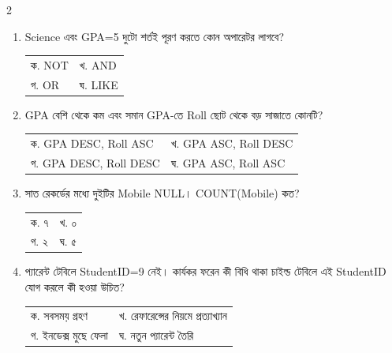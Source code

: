 \begin{multicols}{2}
\begin{enumerate}[resume]
\item \begin{minipage}[t]{\linewidth}
Science এবং GPA=5 দুটো শর্তই পূরণ করতে কোন অপারেটর লাগবে?
\par
\begin{tabularx}{\linewidth}{@{}X X@{}}
ক. NOT & খ. AND \\
গ. OR & ঘ. LIKE \\
\end{tabularx}
\end{minipage}
\vspace{1pt}

\item \begin{minipage}[t]{\linewidth}
GPA বেশি থেকে কম এবং সমান GPA-তে Roll ছোট থেকে বড় সাজাতে কোনটি?
\par
\begin{tabularx}{\linewidth}{@{}X X@{}}
ক. GPA DESC, Roll ASC & খ. GPA ASC, Roll DESC \\
গ. GPA DESC, Roll DESC & ঘ. GPA ASC, Roll ASC \\
\end{tabularx}
\end{minipage}
\vspace{1pt}

\item \begin{minipage}[t]{\linewidth}
সাত রেকর্ডের মধ্যে দুইটির Mobile NULL। COUNT(Mobile) কত?
\par
\begin{tabularx}{\linewidth}{@{}X X@{}}
ক. ৭ & খ. ০ \\
গ. ২ & ঘ. ৫ \\
\end{tabularx}
\end{minipage}
\vspace{1pt}

\item \begin{minipage}[t]{\linewidth}
প্যারেন্ট টেবিলে StudentID=9 নেই। কার্যকর ফরেন কী বিধি থাকা চাইল্ড টেবিলে এই StudentID যোগ করলে কী হওয়া উচিত?
\par
\begin{tabularx}{\linewidth}{@{}X X@{}}
ক. সবসময় গ্রহণ & খ. রেফারেন্সের নিয়মে প্রত্যাখ্যান \\
গ. ইনডেক্স মুছে ফেলা & ঘ. নতুন প্যারেন্ট তৈরি \\
\end{tabularx}
\end{minipage}
\vspace{1pt}


\end{enumerate}
\end{multicols}
